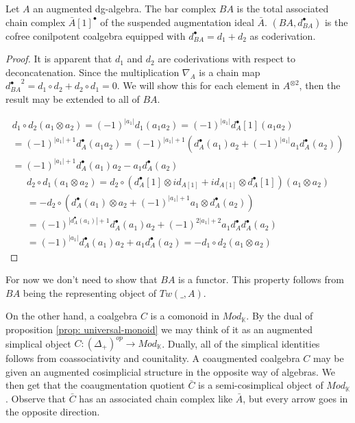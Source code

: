 \documentclass[../thesis.tex]{subfiles}
\begin{document}
            \begin{proposition}
                Let $A$ an augmented dg-algebra. The bar complex $BA$ is the total associated chain complex $\bar{A}[1]^\bullet$ of the suspended augmentation ideal $\bar{A}$. $(BA, d_{BA}^\bullet)$ is the cofree conilpotent coalgebra equipped with $d_{BA}^\bullet = d_1 + d_2$ as coderivation.
            \end{proposition}

            \begin{proof}
                    It is apparent that $d_1$ and $d_2$ are coderivations with respect to deconcatenation. Since the multiplication $\nabla_A$ is a chain map ${d_{BA}^\bullet}^2 = d_1 \circ d_2 + d_2 \circ d_1= 0$. We will show this for each element in $A^{\otimes 2}$, then the result may be extended to all of $BA$.

                \begin{multline*}
                    d_1 \circ d_2 (a_1\otimes a_2) = (-1)^{|a_1|}d_1 (a_1a_2) = (-1)^{|a_1|}d_A^\bullet[1](a_1a_2) \\ = (-1)^{|a_1|+1}d_A^\bullet(a_1a_2) = (-1)^{|a_1|+1}(d_A^\bullet(a_1)a_2 + (-1)^{|a_1|}a_1d_A^\bullet(a_2)) \\ = (-1)^{|a_1|+1}d_A^\bullet(a_1)a_2 - a_1d_A^\bullet(a_2)
                \end{multline*}
                \begin{multline*}
                    d_2\circ d_1 (a_1\otimes a_2) = d_2\circ (d_A^\bullet[1]\otimes id_{A[1]} + id_{A[1]}\otimes d_A^\bullet[1]) (a_1\otimes a_2) \\ = -d_2 \circ (d_A^\bullet(a_1)\otimes a_2 + (-1)^{|a_1|+1}a_1\otimes d_A^\bullet(a_2)) \\ = (-1)^{|d_A^\bullet(a_1)|+1}d_A^\bullet(a_1)a_2 + (-1)^{2|a_1|+2}a_1d_A^\bullet d_A^\bullet(a_2) \\ = (-1)^{|a_1|}d_A^\bullet(a_1)a_2 + a_1d_A^\bullet (a_2) = -d_1\circ d_2 (a_1\otimes a_2)
                \end{multline*}
            \end{proof}

            \begin{remark}
                For now we don't need to show that $BA$ is a functor. This property follows from $BA$ being the representing object of $Tw(\_,A)$.
            \end{remark}

            On the other hand, a coalgebra $C$ is a comonoid in $Mod_\mathbb{K}$. By the dual of proposition \ref{prop: universal-monoid} we may think of it as an augmented simplical object $C:(\Delta_+)^{op} \rightarrow Mod_\mathbb{K}$. Dually, all of the simplical identities follows from coassociativity and counitality. A coaugmented coalgebra $C$ may be given an augmented cosimplicial structure in the opposite way of algebras. We then get that the coaugmentation quotient $\bar{C}$ is a semi-cosimplical object of $Mod_\mathbb{K}$. Observe that $\bar{C}$ has an associated chain complex like $\bar{A}$, but every arrow goes in the opposite direction.
\end{document}

